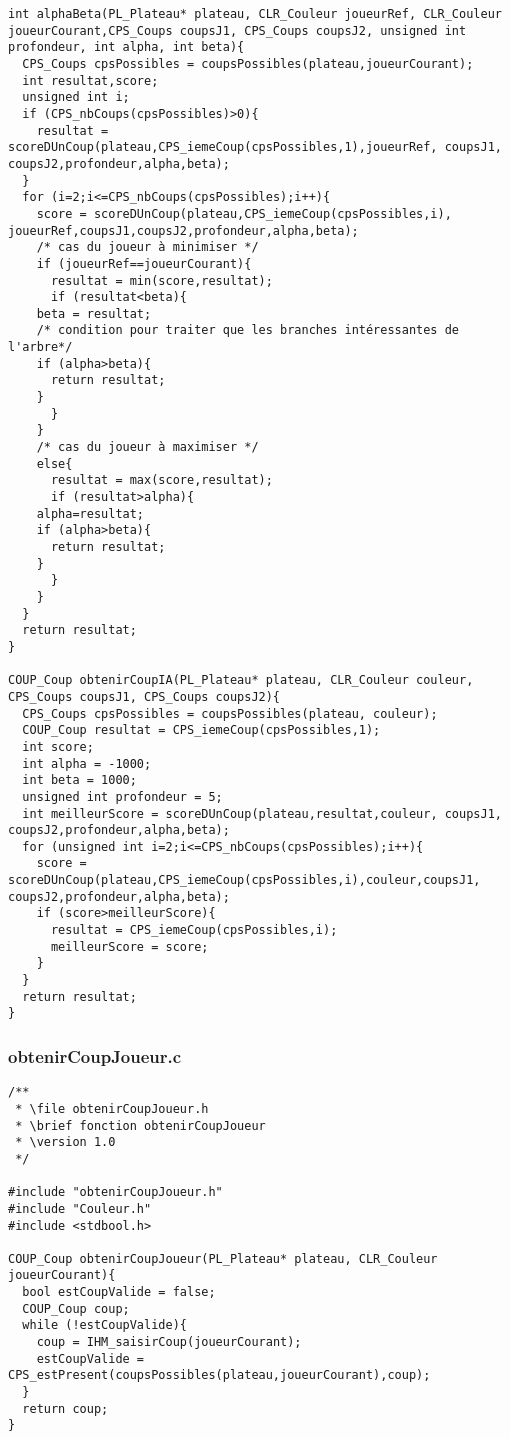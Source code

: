\begin{lstlisting}
int alphaBeta(PL_Plateau* plateau, CLR_Couleur joueurRef, CLR_Couleur joueurCourant,CPS_Coups coupsJ1, CPS_Coups coupsJ2, unsigned int profondeur, int alpha, int beta){
  CPS_Coups cpsPossibles = coupsPossibles(plateau,joueurCourant);
  int resultat,score;
  unsigned int i;
  if (CPS_nbCoups(cpsPossibles)>0){
    resultat = scoreDUnCoup(plateau,CPS_iemeCoup(cpsPossibles,1),joueurRef, coupsJ1, coupsJ2,profondeur,alpha,beta);
  }
  for (i=2;i<=CPS_nbCoups(cpsPossibles);i++){
    score = scoreDUnCoup(plateau,CPS_iemeCoup(cpsPossibles,i), joueurRef,coupsJ1,coupsJ2,profondeur,alpha,beta);
    /* cas du joueur à minimiser */
    if (joueurRef==joueurCourant){
      resultat = min(score,resultat);
      if (resultat<beta){
	beta = resultat;
	/* condition pour traiter que les branches intéressantes de l'arbre*/
	if (alpha>beta){
	  return resultat;
	}
      }
    }
    /* cas du joueur à maximiser */
    else{
      resultat = max(score,resultat);
      if (resultat>alpha){
	alpha=resultat;
	if (alpha>beta){
	  return resultat;
	}
      }
    }
  }
  return resultat;
}

COUP_Coup obtenirCoupIA(PL_Plateau* plateau, CLR_Couleur couleur, CPS_Coups coupsJ1, CPS_Coups coupsJ2){
  CPS_Coups cpsPossibles = coupsPossibles(plateau, couleur);
  COUP_Coup resultat = CPS_iemeCoup(cpsPossibles,1);
  int score;
  int alpha = -1000;
  int beta = 1000;
  unsigned int profondeur = 5; 
  int meilleurScore = scoreDUnCoup(plateau,resultat,couleur, coupsJ1, coupsJ2,profondeur,alpha,beta);
  for (unsigned int i=2;i<=CPS_nbCoups(cpsPossibles);i++){
    score = scoreDUnCoup(plateau,CPS_iemeCoup(cpsPossibles,i),couleur,coupsJ1, coupsJ2,profondeur,alpha,beta);
    if (score>meilleurScore){
      resultat = CPS_iemeCoup(cpsPossibles,i);
      meilleurScore = score;
    }
  }
  return resultat;
}
\end{lstlisting}

\subsubsection{obtenirCoupJoueur.c}
\begin{lstlisting}
/**
 * \file obtenirCoupJoueur.h
 * \brief fonction obtenirCoupJoueur
 * \version 1.0
 */

#include "obtenirCoupJoueur.h"
#include "Couleur.h"
#include <stdbool.h>

COUP_Coup obtenirCoupJoueur(PL_Plateau* plateau, CLR_Couleur joueurCourant){
  bool estCoupValide = false;
  COUP_Coup coup;
  while (!estCoupValide){
    coup = IHM_saisirCoup(joueurCourant);
    estCoupValide = CPS_estPresent(coupsPossibles(plateau,joueurCourant),coup);
  }
  return coup;
}
\end{lstlisting}

